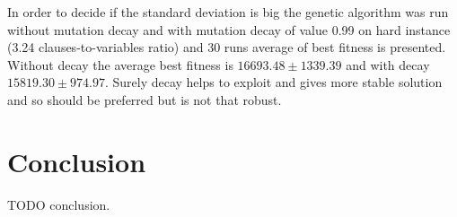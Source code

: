 \documentclass{article}
\begin{document}
In order to decide if the standard deviation is big the genetic algorithm
was run without mutation decay and with mutation decay of value 0.99 on
hard instance (3.24 clauses-to-variables ratio)
and 30 runs average of best fitness is presented.
Without decay the average best fitness is $16693.48 \pm 1339.39$
and with decay $15819.30 \pm 974.97$.
Surely decay helps to exploit and gives more stable solution
and so should be preferred but is not that robust. 

\section{Conclusion}

TODO conclusion.




\end{document}
